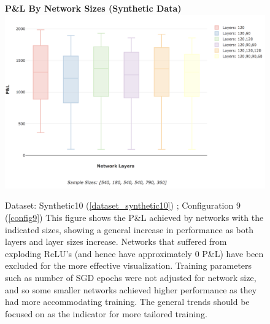 \documentclass[a4paper,11pt,oneside]{article}
\theoremstyle{plain}
\theoremstyle{definition}
\begin{document}
	\begin{figure}[H]
		\centering 
		\textbf{P\&L By Network Sizes (Synthetic Data)}
		\includegraphics[scale=0.3]{images/results/network/synth_pl_box.png} 
		\caption[P\&L By Network Sizes (Synthetic Data)]{Dataset: Synthetic10 (\ref{dataset_synthetic10}) ; Configuration 9 (\ref{config9})
			\newline This figure shows the P\&L achieved by networks with the indicated sizes, showing a general increase in performance as both layers and layer sizes increase. Networks that suffered from exploding ReLU's (and hence have approximately 0 P\&L) have been excluded for the more effective visualization. Training parameters such as number of SGD epochs were not adjusted for network size, and so some smaller networks achieved higher performance as they had more accommodating training. The general trends should be focused on as the indicator for more tailored training.}
		\label{figure-results_synth_pl_box}
	\end{figure}
	
\end{document}
